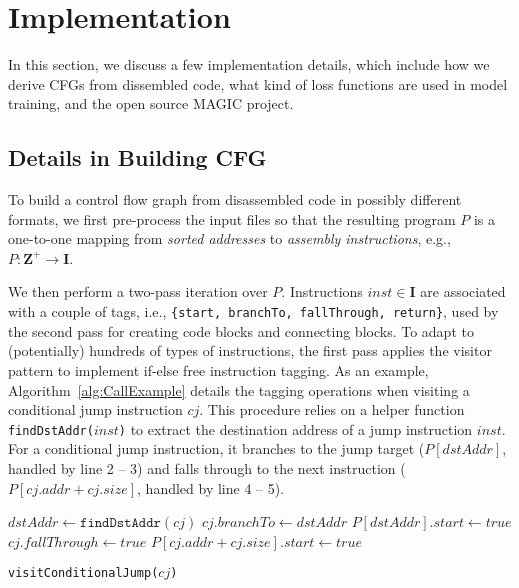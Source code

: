 \section{Implementation}\label{sec:Implement}
In this section, we discuss a few implementation details, which include how we derive CFGs from dissembled code, what kind of loss functions are used in model training, and the open source MAGIC project.

\subsection{Details in Building CFG}
\label{sec:BuildCfg}
To build a control flow graph from disassembled code in possibly different formats, we first pre-process the input files so that the resulting program $P$ is a one-to-one mapping from \textit{sorted addresses} to \textit{assembly instructions}, e.g., $P: \mathbf{Z}^+ \rightarrow \mathbf{I}$.

We then perform a two-pass iteration over $P$.
Instructions $inst \in \mathbf{I}$ are associated with a couple of tags,
i.e., \texttt{\{start, branchTo, fallThrough, return\}}, used by the second pass for creating code blocks and connecting blocks.
To adapt to (potentially) hundreds of types of instructions, the first pass applies the visitor pattern to implement if-else free instruction tagging.
As an example, Algorithm~\ref{alg:CallExample} details the tagging operations when visiting a conditional jump instruction $cj$.
This procedure relies on a helper function \texttt{findDstAddr($inst$)} to extract the destination address of a jump instruction $inst$.
For a conditional jump instruction,
it branches to the jump target ($P[dstAddr]$, handled by line 2 -- 3) and falls through to the next instruction ($P[cj.addr + cj.size]$, handled by line 4 -- 5).


\begin{algorithm}[t]
    \DontPrintSemicolon
    $dstAddr \gets \texttt{findDstAddr}(cj)$\;
    $cj.branchTo \gets dstAddr$\;
    $P[dstAddr].start \gets true$\;
    $cj.fallThrough \gets true$\;
    $P[cj.addr + cj.size].start \gets true$\;
    \caption{\texttt{visitConditionalJump($cj$)}}
    \label{alg:CallExample}
\end{algorithm}

